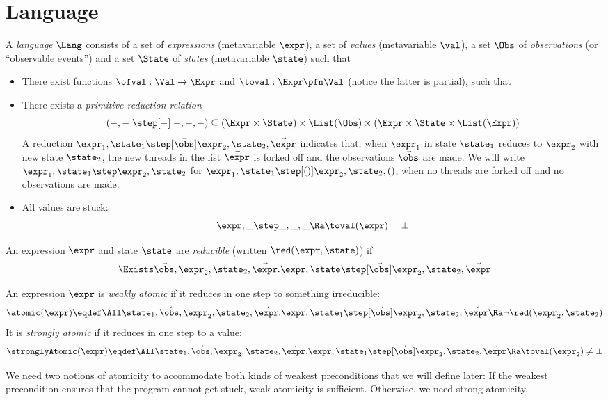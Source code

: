 \section{Language}
\label{sec:language}

A \emph{language} $\Lang$ consists of a set \Expr{} of \emph{expressions} (metavariable $\expr$), a set \Val{} of \emph{values} (metavariable $\val$), a set $\Obs$ of \emph{observations} (or ``observable events'') and a set $\State$ of \emph{states} (metavariable $\state$) such that
\begin{itemize}[itemsep=0pt]
\item There exist functions $\ofval : \Val \to \Expr$ and $\toval : \Expr \pfn \Val$ (notice the latter is partial), such that
\item There exists a \emph{primitive reduction relation} \[(-,- \;\step[-]\; -,-,-) \subseteq (\Expr \times \State) \times \List(\Obs) \times (\Expr \times \State \times \List(\Expr))\]
  A reduction $\expr_1, \state_1 \step[\vec\obs] \expr_2, \state_2, \vec\expr$ indicates that, when $\expr_1$ in state $\state_1$ reduces to $\expr_2$ with new state $\state_2$, the new threads in the list $\vec\expr$ is forked off and the observations $\vec\obs$ are made.
  We will write $\expr_1, \state_1 \step \expr_2, \state_2$ for $\expr_1, \state_1 \step[()] \expr_2, \state_2, ()$, \ie when no threads are forked off and no observations are made. \\
\item All values are stuck:
\[ \expr, \_ \step  \_, \_, \_ \Ra \toval(\expr) = \bot \]
\end{itemize}

\begin{defn}
  An expression $\expr$ and state $\state$ are \emph{reducible} (written $\red(\expr, \state)$) if
  \[ \Exists \vec\obs, \expr_2, \state_2, \vec\expr. \expr,\state \step[\vec\obs] \expr_2,\state_2,\vec\expr \]
\end{defn}

\begin{defn}
  An expression $\expr$ is \emph{weakly atomic} if it reduces in one step to something irreducible:
  \[ \atomic(\expr) \eqdef \All\state_1, \vec\obs, \expr_2, \state_2, \vec\expr. \expr, \state_1 \step[\vec\obs] \expr_2, \state_2, \vec\expr \Ra \lnot \red(\expr_2, \state_2) \]
  It is \emph{strongly atomic} if it reduces in one step to a value:
  \[ \stronglyAtomic(\expr) \eqdef \All\state_1, \vec\obs, \expr_2, \state_2, \vec\expr. \expr, \state_1 \step[\vec\obs] \expr_2, \state_2, \vec\expr \Ra \toval(\expr_2) \neq \bot \]
\end{defn}
We need two notions of atomicity to accommodate both kinds of weakest preconditions that we will define later:
If the weakest precondition ensures that the program cannot get stuck, weak atomicity is sufficient.
Otherwise, we need strong atomicity.

